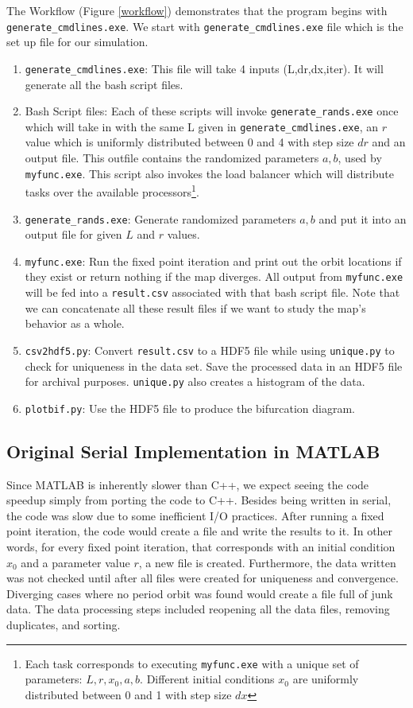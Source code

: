 \documentclass[12pt]{article}
\newcommand{\be}{\begin{enumerate}}
\newcommand{\ee}{\end{enumerate}}
\begin{document}
The Workflow (Figure \ref{workflow}) demonstrates that the program
begins with \texttt{generate\_cmdlines.exe}. We start with
\texttt{generate\_cmdlines.exe} file which is the set up file for our
simulation.
\be
\item \texttt{generate\_cmdlines.exe}: This file will take 4 inputs (L,dr,dx,iter). It will generate all the bash script files. 
\item Bash Script files: Each of these scripts will invoke
\texttt{generate\_rands.exe} once which will take in with the same L
given in \texttt{generate\_cmdlines.exe}, an $r$ value which is
uniformly distributed between 0 and 4 with step size $dr$ and an output
file. This outfile contains the randomized parameters $a,b$, used by
\texttt{myfunc.exe}. This script also invokes the load balancer which
will distribute tasks over the available processors\footnote{Each task
  corresponds to executing \texttt{myfunc.exe} with a unique set of
  parameters: $L,r,x_0,a,b$. Different initial conditions $x_0$ are
  uniformly distributed between 0 and 1 with step size $dx$}.
\item \texttt{generate\_rands.exe}: Generate randomized parameters $a,b$ and put it into an output file for given $L$ and $r$ values.
\item \texttt{myfunc.exe}: Run the fixed point iteration and print out
  the orbit locations if they exist or return nothing if the map
  diverges. All output from \texttt{myfunc.exe} will be fed into a \texttt{result.csv} associated with that bash script file. Note that we can concatenate all these result files if we want to study the map's behavior as a whole. 
\item \texttt{csv2hdf5.py}: Convert \texttt{result.csv} to a HDF5 file
  while using \texttt{unique.py} to check for uniqueness in the data
  set. Save the processed data in an HDF5 file for archival
  purposes. \texttt{unique.py} also creates a histogram of the data.
\item \texttt{plotbif.py}: Use the HDF5 file to produce the bifurcation diagram. 
\ee

\subsection{Original Serial Implementation in MATLAB}
\hspace{5mm} Since MATLAB is inherently slower than C++, we expect seeing the code
speedup simply from porting the code to C++. Besides being written in serial, the code was slow due to some
inefficient I/O practices. After running a fixed point iteration, the
code would create a file and write the results to it. In other words,
for every fixed point iteration, that corresponds with an initial
condition $x_0$ and a parameter value $r$, a new file is
created. Furthermore, the data written was not checked until after all
files were created for uniqueness and convergence. Diverging cases
where no period orbit was found would create a file full of junk
data. The data processing steps included reopening all the data files,
removing duplicates, and sorting. 
\end{document}
